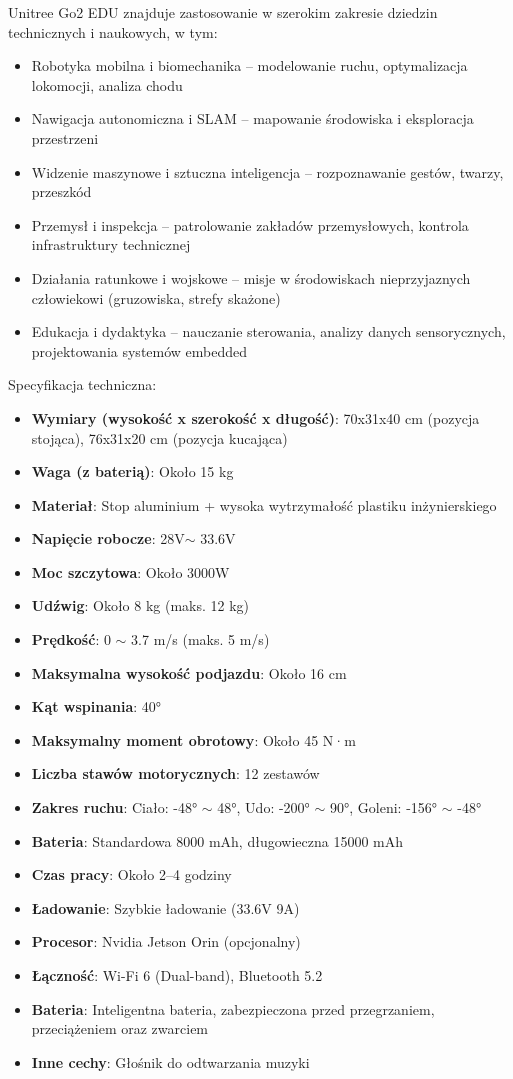 \documentclass[12pt]{article}
\begin{document}
\noindent Unitree Go2 EDU znajduje zastosowanie w szerokim zakresie dziedzin technicznych i naukowych, w tym:
\begin{itemize}
    \item Robotyka mobilna i biomechanika – modelowanie ruchu, optymalizacja lokomocji, analiza chodu
    \item Nawigacja autonomiczna i SLAM – mapowanie środowiska i eksploracja przestrzeni
    \item Widzenie maszynowe i sztuczna inteligencja – rozpoznawanie gestów, twarzy, przeszkód
    \item Przemysł i inspekcja – patrolowanie zakładów przemysłowych, kontrola infrastruktury technicznej
    \item Działania ratunkowe i wojskowe – misje w środowiskach nieprzyjaznych człowiekowi (gruzowiska, strefy skażone)
    \item Edukacja i dydaktyka – nauczanie sterowania, analizy danych sensorycznych, projektowania systemów embedded
\end{itemize}


Specyfikacja techniczna:
\begin{itemize}
    \item \textbf{Wymiary (wysokość x szerokość x długość)}: 70x31x40 cm (pozycja stojąca), 76x31x20 cm (pozycja kucająca)
    \item \textbf{Waga (z baterią)}: Około 15 kg
    \item \textbf{Materiał}: Stop aluminium + wysoka wytrzymałość plastiku inżynierskiego
    \item \textbf{Napięcie robocze}: 28V$ \sim$ 33.6V
    \item \textbf{Moc szczytowa}: Około 3000W
    \item \textbf{Udźwig}: Około 8 kg (maks. 12 kg)
    \item \textbf{Prędkość}: 0 $\sim$ 3.7 m/s (maks. 5 m/s)
    \item \textbf{Maksymalna wysokość podjazdu}: Około 16 cm
    \item \textbf{Kąt wspinania}: 40°
    \item \textbf{Maksymalny moment obrotowy}: Około 45 N·m
    \item \textbf{Liczba stawów motorycznych}: 12 zestawów
    \item \textbf{Zakres ruchu}: Ciało: -48° $\sim$ 48°, Udo: -200° $\sim$ 90°, Goleni: -156° $\sim$ -48°
    \item \textbf{Bateria}: Standardowa 8000 mAh, długowieczna 15000 mAh
    \item \textbf{Czas pracy}: Około 2–4 godziny
    \item \textbf{Ładowanie}: Szybkie ładowanie (33.6V 9A)
    \item \textbf{Procesor}: Nvidia Jetson Orin (opcjonalny)
    \item \textbf{Łączność}: Wi-Fi 6 (Dual-band), Bluetooth 5.2
    \item \textbf{Bateria}: Inteligentna bateria, zabezpieczona przed przegrzaniem, przeciążeniem oraz zwarciem
    \item \textbf{Inne cechy}: Głośnik do odtwarzania muzyki
\end{itemize}
\end{document}
